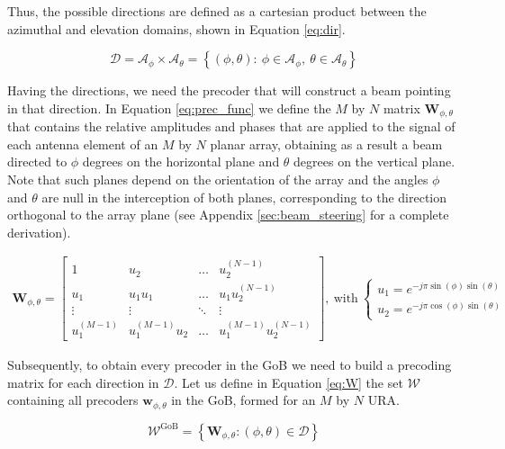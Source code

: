 Thus, the possible directions are defined as a cartesian product between the azimuthal and elevation domains, shown in Equation \eqref{eq:dir}.

\begin{equation} \label{eq:dir}
    \mathcal{D} = \mathcal{A}_\phi \times \mathcal{A}_\theta = \left\{(\phi, \theta) : \ \phi \in \mathcal{A}_\phi , \ \theta \in \mathcal{A}_\theta\right\}
\end{equation}


Having the directions, we need the precoder that will construct a beam pointing in that direction. In Equation \eqref{eq:prec_func} we define the $M$ by $N$ matrix $\bm{W}_{\phi, \theta}$ that contains the relative amplitudes and phases that are applied to the signal of each antenna element of an $M$ by $N$ planar array, obtaining as a result a beam directed to $\phi$ degrees on the horizontal plane and $\theta$ degrees on the vertical plane. Note that such planes depend on the orientation of the array and the angles $\phi$ and $\theta$ are null in the interception of both planes, corresponding to the direction orthogonal to the array plane (see Appendix \ref{sec:beam_steering} for a complete derivation).


\begin{align} \label{eq:prec_func}
    \bm{W}_{\phi, \theta}= 
    \begin{bmatrix}
        1 & u_2 & \dots & u_2^{(N-1)}\\
        u_1 & u_1 u_1 & \dots & u_1 u_2^{(N-1)}\\
        \vdots & \vdots & \ddots & \vdots\\
        u_1^{(M-1)} & u_1^{(M-1)} u_2 & \dots & u_1^{(M-1)} u_2^{(N-1)}
    \end{bmatrix}, \ \text{with} \
    \begin{cases}
        u_1 = e^{-j \pi \sin(\phi) \sin(\theta)} \\
        u_2 = e^{-j \pi \cos(\phi) \sin(\theta)}
    \end{cases}
\end{align}


Subsequently, to obtain every precoder in the GoB we need to build a precoding matrix for each direction in $\mathcal{D}$. Let us define in Equation \eqref{eq:W} the set $\mathcal{W}$ containing all precoders $\bm{w}_{\phi, \theta}$ in the GoB, formed for an $M$ by $N$ \ac{URA}.

\begin{equation} \label{eq:W}
    \mathcal{W}^\text{GoB} = \left\{ \bm{W}_{\phi, \theta} : (\phi, \theta) \in \mathcal{D}\right\}
\end{equation}

